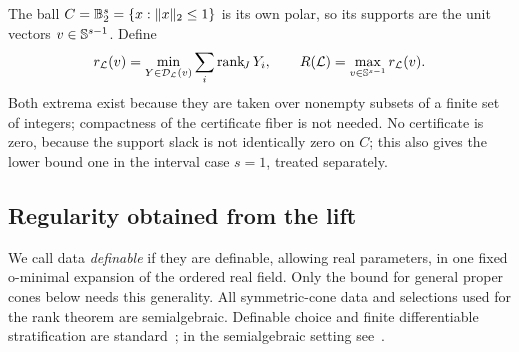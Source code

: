 The ball $C=\mathbb B_2^s=\{x:\lVert x\rVert_2\leq1\}$ is its own polar, so its
supports are the unit vectors $v\in\mathbb S^{s-1}$. Define
\begin{equation}\label{eq:rank-invariant}
 r_{\mathcal L}(v)=\min_{Y\in\mathcal D_{\mathcal L}(v)}\sum_i\operatorname{rank}_{\!J} Y_i,
 \qquad R(\mathcal L)=\max_{v\in\mathbb S^{s-1}}r_{\mathcal L}(v).
\end{equation}
Both extrema exist because they are taken over nonempty subsets of a
finite set of integers; compactness of the certificate fiber is not
needed. No certificate is zero, because the support slack is not
identically zero on $C$; this also gives the lower bound one in the
interval case $s=1$, treated separately.

\subsection{Regularity obtained from the lift}
We call data \emph{definable} if they are definable, allowing real
parameters, in one fixed o-minimal expansion of the ordered real field.
Only the bound for general proper cones below needs this generality. All
symmetric-cone data and selections used for the rank theorem are
semialgebraic. Definable choice and finite differentiable stratification
are standard~\cite{vdDM1996}; in the semialgebraic setting see~\cite{BCR1998}.

